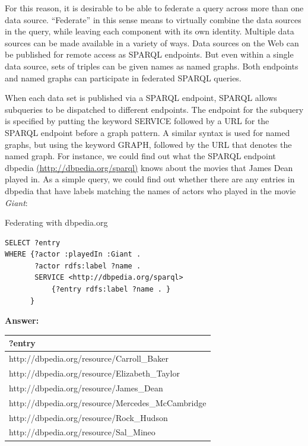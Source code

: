 For this reason, it is desirable to be able to federate a query across
more than one data source. ``Federate'' in this sense means to virtually
combine the data sources in the query, while leaving each component with
its own identity. Multiple data sources can be made available in a
variety of ways. Data sources on the Web can be published for remote
access as SPARQL endpoints. But even within a single data source, sets
of triples can be given names as named graphs. Both endpoints and named
graphs can participate in federated SPARQL queries.

When each data set is published via a SPARQL endpoint, SPARQL allows
subqueries to be dispatched to different endpoints. The endpoint for the subquery is
specified by putting the keyword SERVICE followed by a URL for the
SPARQL endpoint before a graph pattern. A similar syntax is used for
named graphs, but using the keyword GRAPH, followed by the URL that
denotes the named graph. For instance, we could find out what the SPARQL
endpoint dbpedia
\href{http://dbpedia.org/sparql)}{(http://dbpedia.org/sparql)} knows
about the movies that James Dean played in. As a simple query, we could
find out whether there are any entries in dbpedia that have labels
matching the names of actors who played in the movie \emph{Giant}:

\begin{query}Federating with dbpedia.org\end{query}
\begin{lstlisting}
SELECT ?entry
WHERE {?actor :playedIn :Giant .
       ?actor rdfs:label ?name . 
       SERVICE <http://dbpedia.org/sparql>
           {?entry rdfs:label ?name . }
      }
\end{lstlisting}


\textbf{\textbf{Answer:}}

\begin{tabular}{|l|}
\hline
?entry\\
\hline
http://dbpedia.org/resource/Carroll\_Baker\\
http://dbpedia.org/resource/Elizabeth\_Taylor\\
http://dbpedia.org/resource/James\_Dean\\
http://dbpedia.org/resource/Mercedes\_McCambridge\\
http://dbpedia.org/resource/Rock\_Hudson\\
http://dbpedia.org/resource/Sal\_Mineo\\
\hline
\end{tabular}

